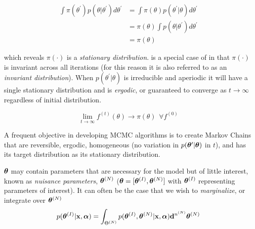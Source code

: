 \vspace{-10pt}

\begin{equation}
\begin{aligned}
\int \pi (\theta^{\prime}) p(\theta|\theta^{\prime}) d\theta^{\prime} &=
\int \pi (\theta) p(\theta^{\prime}|\theta) d\theta^{\prime} \\
&= \pi (\theta) \int p(\theta|\theta^{\prime}) d\theta^{\prime} \\
&= \pi (\theta)
\end{aligned}
\label{eq:er_nr_calibrations_parameter_determ_mcmc_stationary}
\end{equation}

\noindent which reveals $\pi (\cdot)$ is a
\textit{stationary distribution}.   is a special case of
 in that $\pi( \cdot )$ is invariant across all iterations (for this reason
it is also referred to as an \textit{invariant distribution}).  When $p(\theta^{\prime}|\theta)$ is irreducible and
aperiodic it will have a single stationary distribution and is \textit{ergodic}, or guaranteed to converge as
$t \rightarrow \infty$ regardless of initial distribution.

\vspace{-15pt}

\begin{equation}
\lim_{t \rightarrow \infty} f^{(t)}(\theta) \rightarrow \pi (\theta)\ \ \forall f^{(0)}
\label{eq:er_nr_calibrations_parameter_determ_mcmc_converge}
\end{equation}

A frequent objective in developing MCMC algorithms is to create Markov Chains that are reversible, ergodic, homogeneous
(no variation in $p(\boldsymbol{\theta}^{\prime}|\boldsymbol{\theta})$ in $t$), and has its target distribution as its stationary distribution.

$\boldsymbol{\theta}$ may contain parameters that are necessary for the model but of little interest,
known as \textit{nuisance parameters}, $\boldsymbol{\theta}^{(N)}$ ($\boldsymbol{\theta} = [\boldsymbol{\theta}^{(I)}, \boldsymbol{\theta}^{(N)}]$ with
$\boldsymbol{\theta}^{(I)}$ representing parameters of interest).  It can often be the case that we wish to \textit{marginalize}, or integrate
over $\boldsymbol{\theta}^{(N)}$
\begin{equation}
p(\boldsymbol{\theta}^{(I)}|\mathbf{x}, \boldsymbol{\alpha}) = \int_{\Theta^{(N)}}
p(\boldsymbol{\theta}^{(I)}, \boldsymbol{\theta}^{(N)}|\mathbf{x}, \boldsymbol{\alpha}) \mathbf{d}^{n^{(N)}}\boldsymbol{\theta}^{(N)}
\end{equation}

